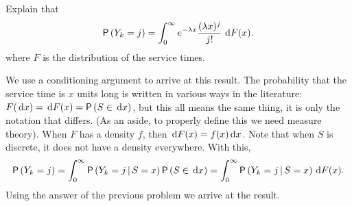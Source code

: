 \begin{exercise}
 Explain that 
\begin{equation}\label{eq:10}
  \P{Y_k = j} = \int_0^\infty e^{-\lambda x}\frac{(\lambda x)^j}{j!}\, \d F(x).
\end{equation}
where $F$ is the distribution of the service times.
\begin{solution}
  We use a conditioning argument to arrive at this result. The
  probability that the service time is $x$ units long is written in
  various ways in the literature: $F(\d x) = \d F(x) = \P{S\in \d x}$,
  but this all means the same thing, it is only the notation that
  differs.  (As an aside, to properly define this we need measure
  theory). When $F$ has a density $f$, then
  $\,\text{d}F(x) = f(x) \,\text{d}x$.  Note that when $S$ is discrete, it does not
  have a density everywhere. With this,
    \begin{equation*}
    \P{Y_k=j} = \int_0^\infty \P{Y_k =j\given S=x}\P{S\in \d x} =
    \int_0^\infty \P{Y_k =j\given S=x} \d F(x).
    \end{equation*}
    Using the answer of the previous problem we arrive at the result.
\end{solution}
\end{exercise}

